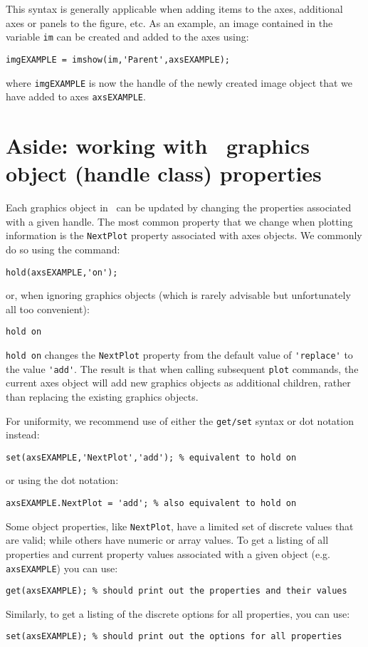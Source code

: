 \documentclass{tufte-handout}
\begin{document}
This syntax is generally applicable when adding items to the axes, additional axes or panels to the figure, etc. As an example, an image contained in the variable \lstinline{im} can be created and added to the axes using:
\begin{lstlisting}[style=usnaMatlab]
imgEXAMPLE = imshow(im,'Parent',axsEXAMPLE);
\end{lstlisting}
where \lstinline{imgEXAMPLE} is now the handle of the newly created image object that we have added to axes \lstinline{axsEXAMPLE}. 

\section{Aside: working with \Matlab\ graphics object (handle class) properties}
Each graphics object in \Matlab\ can be updated by changing the properties associated with a given handle. The most common property that we change when plotting information is the \lstinline{NextPlot} property associated with axes objects. We commonly do so using the command:
\begin{lstlisting}[style=usnaMatlab]
hold(axsEXAMPLE,'on');
\end{lstlisting}
or, when ignoring graphics objects (which is rarely advisable but unfortunately all too convenient):
\begin{lstlisting}[style=usnaMatlab]
hold on
\end{lstlisting}
\lstinline{hold on} changes the \lstinline{NextPlot} property from the default value of \lstinline{'replace'} to the value \lstinline{'add'}. The result is that when calling subsequent \lstinline{plot} commands, the current axes object will add new graphics objects as additional children, rather than replacing the existing graphics objects. 

For uniformity, we recommend use of either the \lstinline{get/set} syntax or dot notation instead:
\begin{lstlisting}[style=usnaMatlab]
set(axsEXAMPLE,'NextPlot','add'); % equivalent to hold on
\end{lstlisting}
or using the dot notation:
\begin{lstlisting}[style=usnaMatlab]
axsEXAMPLE.NextPlot = 'add'; % also equivalent to hold on
\end{lstlisting}

Some object properties, like \lstinline{NextPlot}, have a limited set of discrete values that are valid; while others have numeric or array values. To get a listing of all properties and current property values associated with a given object (e.g. \lstinline{axsEXAMPLE}) you can use:
\begin{lstlisting}[style=usnaMatlab]
get(axsEXAMPLE); % should print out the properties and their values
\end{lstlisting}
Similarly, to get a listing of the discrete options for all properties, you can use:
\begin{lstlisting}[style=usnaMatlab]
set(axsEXAMPLE); % should print out the options for all properties
\end{lstlisting}
\end{document}
